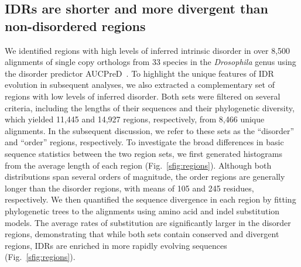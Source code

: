 \subsection{IDRs are shorter and more divergent than non-disordered regions}
We identified regions with high levels of inferred intrinsic disorder in over 8,500 alignments of single copy orthologs from 33 species in the \textit{Drosophila} genus using the disorder predictor AUCPreD~\cite{Wang2016}. To highlight the unique features of IDR evolution in subsequent analyses, we also extracted a complementary set of regions with low levels of inferred disorder. Both sets were filtered on several criteria, including the lengths of their sequences and their phylogenetic diversity, which yielded 11,445 and 14,927 regions, respectively, from 8,466 unique alignments. In the subsequent discussion, we refer to these sets as the ``disorder'' and ``order'' regions, respectively. To investigate the broad differences in basic sequence statistics between the two region sets, we first generated histograms from the average length of each region (Fig.~\ref{sfig:regions}). Although both distributions span several orders of magnitude, the order regions are generally longer than the disorder regions, with means of 105 and 245 residues, respectively. We then quantified the sequence divergence in each region by fitting phylogenetic trees to the alignments using amino acid and indel substitution models. The average rates of substitution are significantly larger in the disorder regions, demonstrating that while both sets contain conserved and divergent regions, IDRs are enriched in more rapidly evolving sequences (Fig.~\ref{sfig:regions}).


